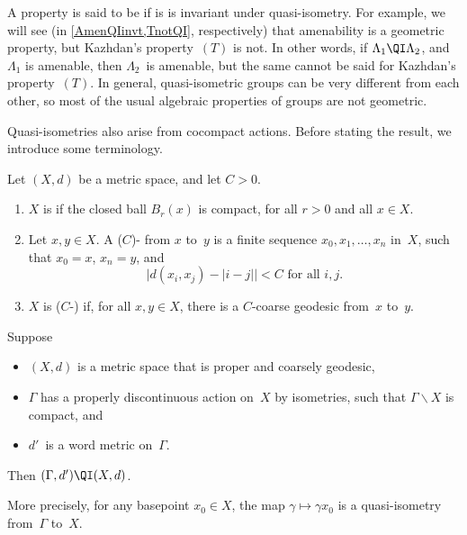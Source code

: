 \begin{rem}
A property is said to be  if is is invariant under quasi-isometry. For example, we will see (in \cref{AmenQIinvt,TnotQI}, respectively) that amenability is a geometric property, but Kazhdan's property~$(T)$ is not. In other words, if $\Lambda_1 \QI \Lambda_2$, and $\Lambda_1$ is amenable, then $\Lambda_2$~is amenable, but the same cannot be said for Kazhdan's property~$(T)$. 
In general, quasi-isometric groups can be very different from each other, so most of the usual algebraic properties of groups are not geometric.
\end{rem}

Quasi-isometries also arise from cocompact actions. Before stating the result, we introduce some terminology.

\begin{defn}
Let $(X,d)$ be a metric space, and let $C > 0$.
\noprelistbreak
	\begin{enumerate}
	\item $X$ is   if the closed ball $B_r(x)$ is compact, for all $r > 0$ and all $x \in X$.
	\item Let $x,y \in X$. A ($C$)- from $x$ to~$y$ is a finite sequence $x_0,x_1,\ldots,x_n$ in~$X$, such that $x_0 = x$, $x_n = y$, and
			$$ \text{$\bigl| d(x_i, x_j) - |i - j| \bigr| < C$ \ for all $i,j$} .$$
	\item $X$ is ($C$-) if, for all $x,y \in X$, there is a $C$-coarse geodesic from~$x$ to~$y$.
	\end{enumerate}
\end{defn}

\begin{prop} \label{CocpctActIsQI}
Suppose
	\begin{itemize}
	\item $(X,d)$ is a metric space that is proper and coarsely geodesic,
	\item $\Gamma$ has a properly discontinuous action on~$X$ by isometries, such that $\Gamma \backslash X$ is compact,
	and
	\item $d'$~is a word metric on~$\Gamma$.
	\end{itemize}
Then $(\Gamma,d') \QI (X,d)$.

More precisely, for any basepoint $x_0 \in X$, the map $\gamma \mapsto \gamma x_0$ is a quasi-isometry from\/~$\Gamma$ to~$X$.
\end{prop}

